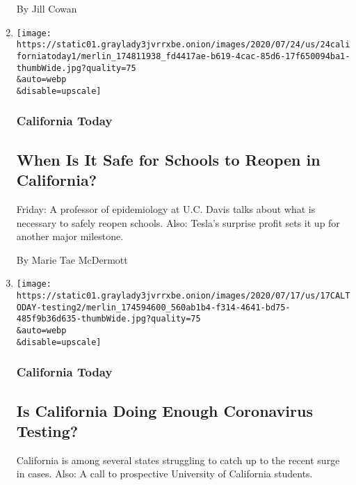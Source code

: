 \begin{enumerate}
  By Jill Cowan
\item
  \href{/2020/07/24/us/ca-schools-reopening.html}{}

  \texttt{[image: https://static01.graylady3jvrrxbe.onion/images/2020/07/24/us/24californiatoday1/merlin\_174811938\_fd4417ae-b619-4cac-85d6-17f650094ba1-thumbWide.jpg?quality=75\\\&auto=webp\\\&disable=upscale]}

  \hypertarget{california-today-4}{%
  \subsubsection{California Today}\label{california-today-4}}

  \hypertarget{when-is-it-safe-for-schools-to-reopen-in-california}{%
  \subsection{When Is It Safe for Schools to Reopen in
  California?}\label{when-is-it-safe-for-schools-to-reopen-in-california}}

  Friday: A professor of epidemiology at U.C. Davis talks about what is
  necessary to safely reopen schools. Also: Tesla's surprise profit sets
  it up for another major milestone.

  By Marie Tae McDermott
\item
  \href{/2020/07/17/us/ca-coronavirus-covid-testing.html}{}

  \texttt{[image: https://static01.graylady3jvrrxbe.onion/images/2020/07/17/us/17CALTODAY-testing2/merlin\_174594600\_560ab1b4-f314-4641-bd75-485f9b36d635-thumbWide.jpg?quality=75\\\&auto=webp\\\&disable=upscale]}

  \hypertarget{california-today-5}{%
  \subsubsection{California Today}\label{california-today-5}}

  \hypertarget{is-california-doing-enough-coronavirus-testing}{%
  \subsection{Is California Doing Enough Coronavirus
  Testing?}\label{is-california-doing-enough-coronavirus-testing}}

  California is among several states struggling to catch up to the
  recent surge in cases. Also: A call to prospective University of
  California students.


\end{enumerate}
